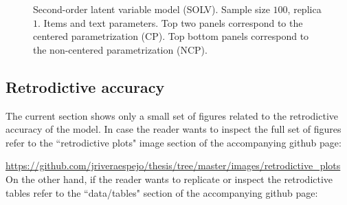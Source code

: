 %
\begin{figure}[H]
	\centering
	\begin{subfigure}
		\texttt{[image: SOLV\_CE\_J100\_Ndata1\_items]}
	\end{subfigure}
	\begin{subfigure}
		\texttt{[image: SOLV\_NC\_J100\_Ndata1\_items]}
	\end{subfigure}
	\caption[First-order latent variable model (FOLV). Sample size $100$, replica $1$. Items and text parameters.]%
	{Second-order latent variable model (SOLV). Sample size $100$, replica $1$. Items and text parameters. Top two panels correspond to the centered parametrization (CP). Top bottom panels correspond to the non-centered parametrization (NCP).}
	\label{fig:SOLV_recovery2}
\end{figure}





\newpage
\subsection{Retrodictive accuracy} \label{sub_sect:retro_accuracy}

The current section shows only a small set of figures related to the retrodictive accuracy of the model. In case the reader wants to inspect the full set of figures refer to the ``retrodictive plots" image section of the accompanying github page:

\noindent \url{https://github.com/jriveraespejo/thesis/tree/master/images/retrodictive_plots} \\


On the other hand, if the reader wants to replicate or inspect the retrodictive tables refer to the ``data/tables" section of the accompanying github page:

